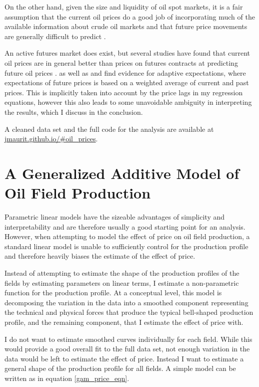 \documentclass[12pt]{article}
\begin{document}
On the other hand, given the size and liquidity of oil spot markets, it is a fair assumption that the current oil prices do a good job of incorporating much of the available information about crude oil markets and that future price movements are generally difficult to predict \citep{hamilton_understanding_2008}.

An active futures market does exist, but several studies have found that current oil prices are in general better than prices on futures contracts at predicting future oil prices \citep{alquist_what_2010, chinn_predictive_2005}.  \citet{mohn_investment_2008} as well as \citet{pesaran_econometric_1990} and \citet{farzin_impact_2001} find evidence for adaptive expectations, where expectations of future prices is based on a weighted average of current and past prices. This is implicitly taken into account by the price lags in my regression equations, however this also leads to some unavoidable ambiguity in interpreting the results, which I discuss in the conclusion. 

A cleaned data set and the full code for the analysis are available at \url{jmaurit.github.io/#oil_prices}.

\section{A Generalized Additive Model of Oil Field Production}
Parametric linear models have the sizeable advantages of simplicity and interpretability and are therefore usually a good starting point for an analysis. However, when attempting to model the effect of price on oil field production, a standard linear model is unable to sufficiently control for the production profile and therefore heavily biases the estimate of the effect of price.
  
Instead of attempting to estimate the shape of the production profiles of the fields by estimating parameters on linear terms, I estimate a non-parametric function for the production profile. At a conceptual level, this model is decomposing the variation in the data into a smoothed component representing the technical and physical forces that produce the typical bell-shaped production profile, and the remaining component, that I estimate the effect of price with.  

I do not want to estimate smoothed curves individually for each field. While this would provide a good overall fit to the full data set, not enough variation in the data would be left to estimate the effect of price.  Instead I want to estimate a general shape of the production profile for all fields. A simple model can be written as in equation \ref{gam_price_eqn}. 
\end{document}
